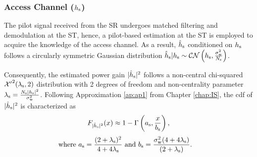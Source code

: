 \subsubsection*{Access Channel ($h_{\text{s}}$)}
The pilot signal received from the SR undergoes matched filtering and demodulation at the ST, hence, a pilot-based estimation at the ST is employed to acquire the knowledge of the access channel. %
As a result, $\hat{h}_{\text{s}}$ conditioned on $h_{\text{s}}$ follows a circularly symmetric Gaussian distribution
$\hat{h}_{\text{s}}|h_{\text{s}} \sim \mathcal{CN}\left( h_{\text{s}},\frac{\sigma^2_{\text{w}}}{N_{\text{s}}} \right)$.

Consequently, the estimated power gain $|\hat{h}_{\text{s}}|^2$ follows a non-central chi-squared $\ncchi2(\ls, 2)$ distribution with 2 degrees of freedom and non-centrality parameter $\lambda_{\text{s}} = \frac{N_{\text{s}} |h_{\text{s}}|^2}{\sigma^2_{\text{w}}}$. 
Following Approximation \ref{ap:ap1} from Chapter \ref{chap:IS}, the cdf of $|\hat{h}_{\text{s}}|^2$ is characterized as
\begin{align}
F_{|\hat{h}_{\text{s}}|^2}(x) \approx 1 - \Gamma \left(a_{\text{s}}, \frac{x}{b_{\text{s}}} \right) \label{eq_HS:fephs}, 
\end{align}
\begin{align}
\text{where  } a_{\text{s}} = \frac{(2 + \lambda_{\text{s}})^2}{4 + 4 \lambda_{\text{s}}} &\text{ and } b_{\text{s}} = \frac{\sigma^2_{\text{w}} (4 + 4 \lambda_{\text{s}})}{(2 + \lambda_{\text{s}})}.  \label{eq_HS:para_hs} 
\end{align}

